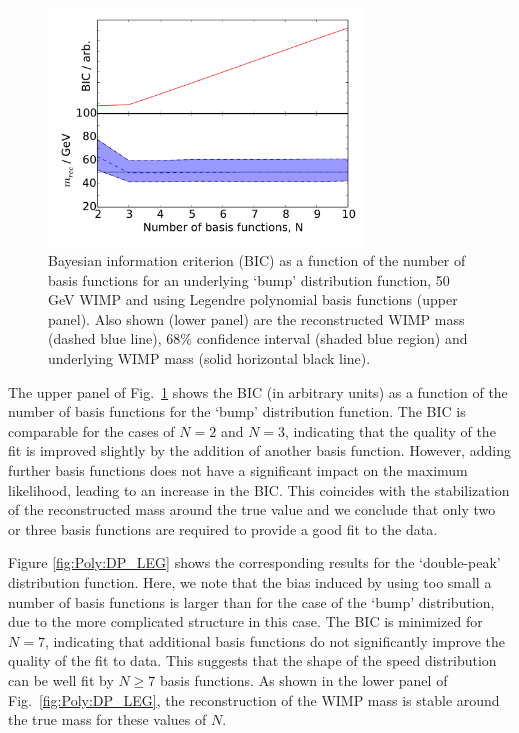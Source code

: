 \begin{figure}[t]
\centering
  \includegraphics[width=0.75\textwidth]{Poly/VaryingN_BUMP_LEG.pdf}
  \caption[Bayesian information criterion and reconstructed WIMP mass as a function of the number of basis functions for a 50 GeV WIMP with `bump' distribution function]{Bayesian information criterion (BIC) as a function of the number of basis functions for an underlying `bump' distribution function, 50 GeV WIMP and using Legendre polynomial basis functions (upper panel). Also shown (lower panel) are the reconstructed WIMP mass (dashed blue line), 68\% confidence interval (shaded blue region) and underlying WIMP mass (solid horizontal black line).}
  \label{fig:Poly:BUMP_LEG}
\end{figure}

The upper panel of Fig.~\ref{fig:Poly:BUMP_LEG} shows the BIC (in arbitrary units) as a function of the number of basis functions for the `bump' distribution function. The BIC is comparable for the cases of $N=2$ and $N=3$, indicating that the quality of the fit is improved slightly by the addition of another basis function. However, adding further basis functions does not have a significant impact on the maximum likelihood, leading to an increase in the BIC. This coincides with the stabilization of the reconstructed mass around the true value and we conclude that only two or three basis functions are required to provide a good fit to the data.

Figure \ref{fig:Poly:DP_LEG} shows the corresponding results for the `double-peak' distribution function. Here, we note that the bias induced by using too small a number of basis functions is larger than for the case of the `bump' distribution, due to the more complicated structure in this case. The BIC is minimized for $N=7$, indicating that additional basis functions do not significantly improve the quality of the fit to data. This suggests that the shape of the speed distribution can be well fit by $N\geq7$ basis functions. As shown in the lower panel of Fig.~\ref{fig:Poly:DP_LEG}, the reconstruction of the WIMP mass is stable around the true mass for these values of $N$.

